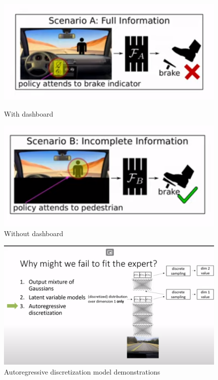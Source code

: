 \documentclass[]{article}
\begin{document}
\begin{figure}[!ht]
\centering
\begin{minipage}[t]{.45\textwidth}
    \centering
    \includegraphics[scale=0.4]{cap2img/slide20a.png}
    \caption{With dashboard}
    \label{fig:breakindicator1}
\end{minipage}
\begin{minipage}[t]{.45\textwidth}
    \centering
    \includegraphics[scale=0.4]{cap2img/slide20b.png}
    \caption{Without dashboard}
    \label{fig:breakindicator2}
\end{minipage}
\label{fig:breakindicatorfig}
\end{figure}

\begin{figure}
\begin{center}
    \includegraphics[scale=0.4]{cap2img/slide24.png}
\end{center}
\caption{Autoregressive discretization model demonstrations}
\label{fig:autoregressive}
\end{figure}
\end{document}
